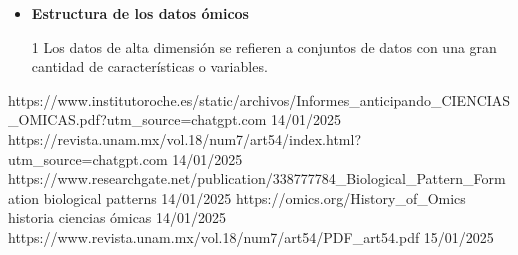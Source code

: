 \documentclass{article}
\begin{document}
\begin{itemize}
    
    La información obtenida a través de tecnologías aplicadas en las ciencias ómicas se denomina \textbf{"dato ómico"}.
    Este tipo de dato representa un conjunto de información caracterizado por su alta dimensionalidad, lo que lo
    convierte en una herramienta clave para el análsis integral de organismos vivos.

    Aldededor del 1980, se acuñó el término "ómica" para hacer referencia al estudio de un conjunto de moléculas. Por
    ejemplo, la genómica se refiere al estudio de un conjunto de genes en el ADN, la transcriptómica es el estudio de
    muchos transcritos o ARNm, o la proteómica; el estudio de un conjunto de proteinas, etc.
    
    
    \item \textbf{Estructura de los datos ómicos}



    1 Los datos de alta dimensión se refieren a conjuntos de datos con una gran cantidad de características
    o variables. 

\end{itemize}


https://www.institutoroche.es/static/archivos/Informes_anticipando_CIENCIAS_OMICAS.pdf?utm_source=chatgpt.com 14/01/2025
https://revista.unam.mx/vol.18/num7/art54/index.html?utm_source=chatgpt.com  14/01/2025
https://www.researchgate.net/publication/338777784_Biological_Pattern_Formation biological patterns 14/01/2025
https://omics.org/History_of_Omics historia ciencias ómicas 14/01/2025
https://www.revista.unam.mx/vol.18/num7/art54/PDF_art54.pdf  15/01/2025
\end{document}

